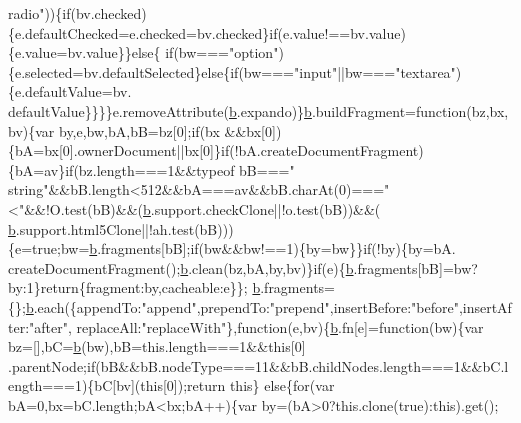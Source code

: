 \begin{DoxyCode}
{      radio"}))\{\textcolor{keywordflow}{if}(bv.checked)\{e.defaultChecked=e.checked=bv.checked\}\textcolor{keywordflow}{if}(e.value!==bv.value)\{e.value=bv.value\}\}\textcolor{keywordflow}{else}\{\textcolor{keywordflow}{
      if}(bw===\textcolor{stringliteral}{"option"})\{e.selected=bv.defaultSelected\}\textcolor{keywordflow}{else}\{\textcolor{keywordflow}{if}(bw===\textcolor{stringliteral}{"input"}||bw===\textcolor{stringliteral}{"textarea"})\{e.defaultValue=bv.
      defaultValue\}\}\}\}e.removeAttribute(\hyperlink{a00039_aa4026ad5544b958e54ce5e106fa1c805}{b}.expando)\}\hyperlink{a00039_aa4026ad5544b958e54ce5e106fa1c805}{b}.buildFragment=\textcolor{keyword}{function}(bz,bx,bv)\{var by,e,bw,bA,bB=bz[0];\textcolor{keywordflow}{if}(bx
      &&bx[0])\{bA=bx[0].ownerDocument||bx[0]\}\textcolor{keywordflow}{if}(!bA.createDocumentFragment)\{bA=av\}\textcolor{keywordflow}{if}(bz.length===1&&typeof bB===\textcolor{stringliteral}{"
      string"}&&bB.length<512&&bA===av&&bB.charAt(0)===\textcolor{stringliteral}{"<"}&&!O.test(bB)&&(\hyperlink{a00039_aa4026ad5544b958e54ce5e106fa1c805}{b}.support.checkClone||!o.test(bB))&&(
      \hyperlink{a00039_aa4026ad5544b958e54ce5e106fa1c805}{b}.support.html5Clone||!ah.test(bB)))\{e=\textcolor{keyword}{true};bw=\hyperlink{a00039_aa4026ad5544b958e54ce5e106fa1c805}{b}.fragments[bB];\textcolor{keywordflow}{if}(bw&&bw!==1)\{by=bw\}\}\textcolor{keywordflow}{if}(!by)\{by=bA.
      createDocumentFragment();\hyperlink{a00039_aa4026ad5544b958e54ce5e106fa1c805}{b}.clean(bz,bA,by,bv)\}\textcolor{keywordflow}{if}(e)\{\hyperlink{a00039_aa4026ad5544b958e54ce5e106fa1c805}{b}.fragments[bB]=bw?by:1\}\textcolor{keywordflow}{return}\{fragment:by,cacheable:e\}\};
      \hyperlink{a00039_aa4026ad5544b958e54ce5e106fa1c805}{b}.fragments=\{\};\hyperlink{a00039_aa4026ad5544b958e54ce5e106fa1c805}{b}.each(\{appendTo:\textcolor{stringliteral}{"append"},prependTo:\textcolor{stringliteral}{"prepend"},insertBefore:\textcolor{stringliteral}{"before"},insertAfter:\textcolor{stringliteral}{"after"},
      replaceAll:\textcolor{stringliteral}{"replaceWith"}\},\textcolor{keyword}{function}(e,bv)\{\hyperlink{a00039_aa4026ad5544b958e54ce5e106fa1c805}{b}.fn[e]=\textcolor{keyword}{function}(bw)\{var bz=[],bC=\hyperlink{a00039_aa4026ad5544b958e54ce5e106fa1c805}{b}(bw),bB=this.length===1&&\textcolor{keyword}{this}[0]
      .parentNode;\textcolor{keywordflow}{if}(bB&&bB.nodeType===11&&bB.childNodes.length===1&&bC.length===1)\{bC[bv](\textcolor{keyword}{this}[0]);\textcolor{keywordflow}{return} \textcolor{keyword}{this}\}\textcolor{keywordflow}{
      else}\{\textcolor{keywordflow}{for}(var bA=0,bx=bC.length;bA<bx;bA++)\{var by=(bA>0?this.clone(\textcolor{keyword}{true}):this).get();

\end{DoxyCode}
